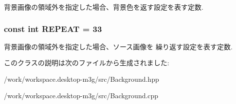 背景画像の領域外を指定した場合、背景色を返す設定を表す定数. \hypertarget{classm3g_1_1Background_a466d02b3d88f856854d0a0955be32e8}{
\subsubsection[{REPEAT}]{\setlength{\rightskip}{0pt plus 5cm}const int {\bf REPEAT} = 33}}
\label{classm3g_1_1Background_a466d02b3d88f856854d0a0955be32e8}


背景画像の領域外を指定した場合、ソース画像を 繰り返す設定を表す定数. 

このクラスの説明は次のファイルから生成されました:\begin{CompactItemize}
\item 
/work/workspace.desktop-m3g/src/Background.hpp\item 
/work/workspace.desktop-m3g/src/Background.cpp\end{CompactItemize}
